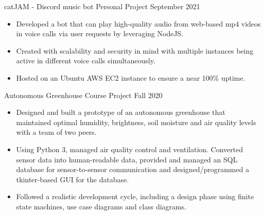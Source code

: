 \documentclass[10pt,a4paper]{altacv}
\begin{document}
\divider

\cvproject
	{catJAM - Discord music bot}
    {Personal Project}
    {September 2021}
\begin{itemize}
	\item {Developed a bot that can play high-quality audio from web-based mp4 videos in voice calls via user requests by leveraging NodeJS.}
	\item {Created with scalability and security in mind with multiple instances being active in different voice calls simultaneously.}
	\item {Hosted on an Ubuntu AWS EC2 instance to ensure a near 100\% uptime.}
\end{itemize}

\divider

\cvproject
	{Autonomous Greenhouse}
    {Course Project}
    {Fall 2020}
\begin{itemize}
	\item {Designed and built a prototype of an autonomous greenhouse that maintained optimal humidity, brightness, soil moisture and air quality levels with a team of two peers.}
	\item {Using Python 3, managed air quality control and ventilation. Converted sensor data into human-readable data, provided and managed an SQL database for sensor-to-sensor communication and designed/programmed a tkinter-based GUI for the database.}
	\item {Followed a realistic development cycle, including a design phase using finite state machines, use case diagrams and class diagrams.}
\end{itemize}


\end{document}
